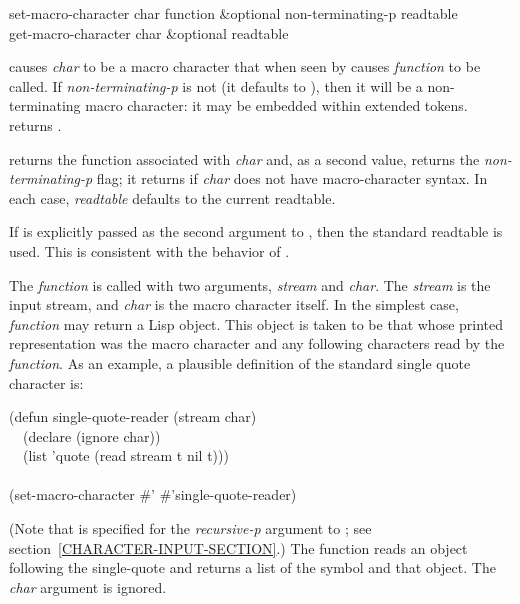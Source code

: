 \begin{defun}[Function]
set-macro-character char function &optional non-terminating-p readtable \\
get-macro-character char &optional readtable

 causes \emph{char} to be a macro character that
when seen by  causes \emph{function} to be called.
If \emph{non-terminating-p} is not {\false} (it defaults to {\false}),
then it will be a non-terminating macro character: it may be embedded
within extended tokens.
 returns {\true}.

 returns the function associated with \emph{char}
and, as a second value, returns the \emph{non-terminating-p} flag; it returns
{\false} if \emph{char} does not have macro-character syntax.  In each case,
\emph{readtable} defaults to the current readtable.

If  is explicitly passed as the
second argument to , then the standard readtable is used.
This is consistent with the behavior of .

The \emph{function} is called with two arguments, \emph{stream}
and \emph{char}.  The \emph{stream} is the input stream, and \emph{char} is the
macro character itself.
In the simplest case, \emph{function} may return a Lisp object.
This object is taken to be that whose printed representation
was the macro character and any following characters read
by the \emph{function}.
As an example, a plausible definition of the standard single quote
character is:
\begin{lisp}
(defun single-quote-reader (stream char) \\
~~(declare (ignore char)) \\
~~(list 'quote (read stream t nil t))) \\
 \\
(set-macro-character \#{\Xbackslash}' \#'single-quote-reader)
\end{lisp}
(Note that {\true} is specified for the \emph{recursive-p} argument
to ; see section~\ref{CHARACTER-INPUT-SECTION}.)
The function reads an object following the single-quote and returns
a list of the symbol  and that object.
The \emph{char} argument is ignored.



\end{defun}
